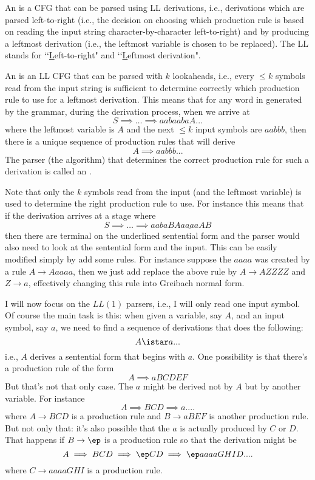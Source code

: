 An  is a CFG that can be parsed
using LL derivations, i.e., derivations which are
parsed left-to-right (i.e., the decision on choosing
which production rule is based on reading the input
string character-by-character left-to-right)
and by producing a leftmost derivation (i.e.,
the leftmost variable is chosen to be replaced).
The LL stands for \lq\lq \underline{L}eft-to-right" and
\lq\lq \underline{L}eftmost derivation".

An 
is an LL CFG that can be parsed with $k$ lookaheads, i.e.,
every $\leq k$ symbols read from the input string is sufficient
to determine correctly which production rule to use for a
leftmost derivation.
This means that for any word in generated by the grammar,
during the derivation process, when we arrive at
\[
S \implies \ldots \implies aabaabaA...
\]
where the leftmost variable is $A$ and the next $\leq k$ input symbols are
$aabbb$, then there is a unique sequence of production rules
that will derive
\[
A \implies aabbb ...
\]  
The parser (the algorithm) that determines the correct production
rule for such a derivation is called an
.

Note that only the $k$ symbols read from the input (and the leftmost
variable) is used to
determine the right production rule to use.
For instance this means that if the derivation arrives at a stage where
\[
S \implies \ldots \implies aaba\underline{BAaaaaAB}
\]
then there are terminal on the underlined sentential form
and the parser would also need to look at the sentential form and the input.
This can be easily modified simply by add some rules.
For instance suppose the $aaaa$ was created by a rule $A \rightarrow Aaaaa$,
then we just add replace the above rule by $A \rightarrow AZZZZ$ and
$Z \rightarrow a$, effectively changing this rule into Greibach normal form.

I will now focus on the $LL(1)$ parsers, i.e., I will only read one
input symbol.
Of course the main task is this: when given a variable, say $A$, and an input
symbol, say $a$, we need to find a sequence of derivations that does the
following:
\[
A \istar  a ...
\]
i.e., $A$ derives a sentential form that begins with $a$.
One possibility is that there's a production rule of the form
\[
A \implies aBCDEF
\]
But that's not that only case.
The $a$ might be derived not by $A$ but by another variable.
For instance
\[
A \implies BCD \implies a ....
\]
where $A \rightarrow BCD$ is a production rule and $B \rightarrow aBEF$
is another production rule.
But not only that: it's also possible that the $a$ is actually produced by
$C$ or $D$.
That happens if $B \rightarrow \ep$ is a production rule so that
the derivation might be
\[
A \implies BCD \implies \ep CD \implies \ep aaaaGHID ....
\]
where $C \rightarrow aaaaGHI$ is a production rule.

